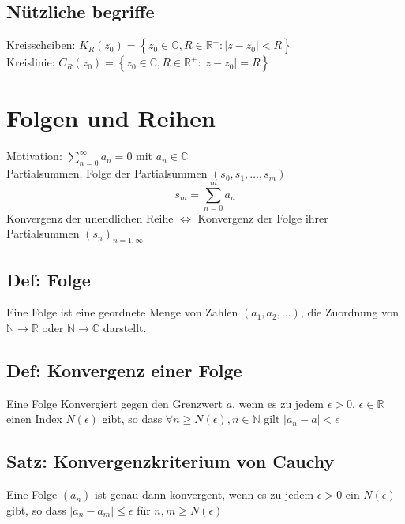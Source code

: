 \subsection*{Nützliche begriffe}

Kreisscheiben: $ K_R(z_0) = \left\{ z_0 \in \mathbb{C}, R \in \mathbb{R}^+ : | z - z_0 | < R \right\} $\\
Kreislinie: $ C_{R}(z_0) = \left\{ z_0 \in \mathbb{C}, R \in \mathbb{R}^+ : | z - z_0 | = R \right\} $


\section{Folgen und Reihen}

Motivation: $ \sum_{n=0}^{\infty} a_n = 0 $ mit $ a_n \in \mathbb{C} $\\[5pt]
Partialsummen, Folge der Partialsummen $ (s_0, s_1, \dots, s_m) $
\begin{equation*}
s_m = \sum_{n=0}^{m} a_n
\end{equation*}
Konvergenz der unendlichen Reihe $ \Leftrightarrow $ Konvergenz der Folge ihrer Partialsummen $ (s_n)_{n = 1, \infty} $

\subsection*{Def: Folge}

Eine Folge ist eine geordnete Menge von Zahlen $ (a_1, a_2, \dots) $, die Zuordnung von $ \mathbb{N} \to \mathbb{R} $ oder $ \mathbb{N} \to \mathbb{C} $ darstellt.

\subsection*{Def: Konvergenz einer Folge}

Eine Folge Konvergiert gegen den Grenzwert $ a $, wenn es zu jedem $ \epsilon > 0 $, $ \epsilon \in \mathbb{R} $ einen Index $ N(\epsilon) $ gibt, so dass $ \forall n \ge N(\epsilon), n \in \mathbb{N} $  gilt $ | a_{n} - a | < \epsilon $

\subsection*{Satz: Konvergenzkriterium von Cauchy}

Eine Folge $ (a_n) $ ist genau dann konvergent, wenn es zu jedem $ \epsilon > 0 $ ein $ N(\epsilon) $ gibt, so dass $ |a_n - a_m| \le \epsilon $ für $ n,m \ge N(\epsilon) $


